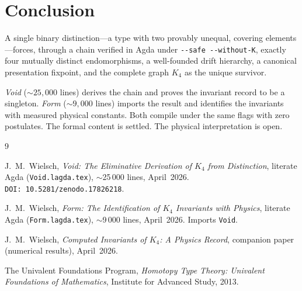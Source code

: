 \documentclass[11pt,a4paper]{article}
\theoremstyle{definition}
\begin{document}
\section{Conclusion}
\label{sec:conclusion}

A single binary distinction---a type with two provably unequal, covering
elements---forces, through a chain verified in Agda under
\texttt{-{}-safe -{}-without-K}, exactly four mutually distinct
endomorphisms, a well-founded drift hierarchy, a canonical presentation
fixpoint, and the complete graph $K_4$ as the unique survivor.

\textit{Void} (${\sim}25{,}000$ lines) derives the chain and proves the
invariant record to be a singleton.  \textit{Form} (${\sim}9{,}000$ lines)
imports the result and identifies the invariants with measured physical
constants.  Both compile under the same flags with zero postulates.
The formal content is settled.  The physical interpretation is open.

\begin{thebibliography}{9}

J.~M.~Wielsch,
\textit{Void: The Eliminative Derivation of $K_4$ from Distinction},
literate Agda (\texttt{Void.lagda.tex}), $\sim$25\,000 lines, April~2026.
\texttt{DOI:~10.5281/zenodo.17826218}.

J.~M.~Wielsch,
\textit{Form: The Identification of $K_4$ Invariants with Physics},
literate Agda (\texttt{Form.lagda.tex}), $\sim$9\,000 lines, April~2026.
Imports \texttt{Void}.

J.~M.~Wielsch,
\textit{Computed Invariants of $K_4$: A Physics Record},
companion paper (numerical results), April~2026.

The Univalent Foundations Program,
\textit{Homotopy Type Theory: Univalent Foundations of Mathematics},
Institute for Advanced Study, 2013.

\end{thebibliography}
\end{document}
